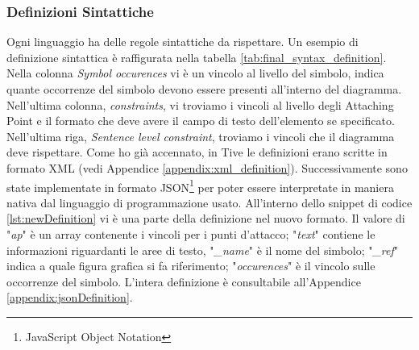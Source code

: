             \subsubsection{Definizioni Sintattiche}
                Ogni linguaggio ha delle regole sintattiche da rispettare. Un esempio di definizione sintattica è raffigurata nella tabella \ref{tab:final_syntax_definition}. Nella colonna \textit{Symbol occurences} vi è un vincolo al livello del simbolo, indica quante occorrenze del simbolo devono essere presenti all'interno del diagramma. Nell'ultima colonna, \textit{constraints}, vi troviamo i vincoli al livello degli Attaching Point e il formato che deve avere il campo di testo dell'elemento se specificato. Nell'ultima riga, \textit{Sentence level constraint}, troviamo i vincoli che il diagramma deve rispettare.
                \newline
                Come ho già accennato, in Tive le definizioni erano scritte in formato XML (vedi Appendice \ref{appendix:xml_definition}). Successivamente sono state implementate in formato JSON\footnote{JavaScript Object Notation} per poter essere interpretate in maniera nativa dal linguaggio di programmazione usato. All'interno dello snippet di codice \ref{lst:newDefinition} vi è una parte della definizione nel nuovo formato. 
                \newline
                Il valore di "\textit{ap}" è un array contenente i vincoli per i punti d'attacco; "\textit{text}" contiene le informazioni riguardanti le aree di testo, "\textit{\_name}" è il nome del simbolo; "\textit{\_ref}" indica a quale figura grafica si fa riferimento; "\textit{occurences}" è il vincolo sulle occorrenze del simbolo.
                \newline
                L'intera definizione è consultabile all'Appendice \ref{appendix:jsonDefinition}.
                \begin{spacing}{0.5}
                    
                \end{spacing}


